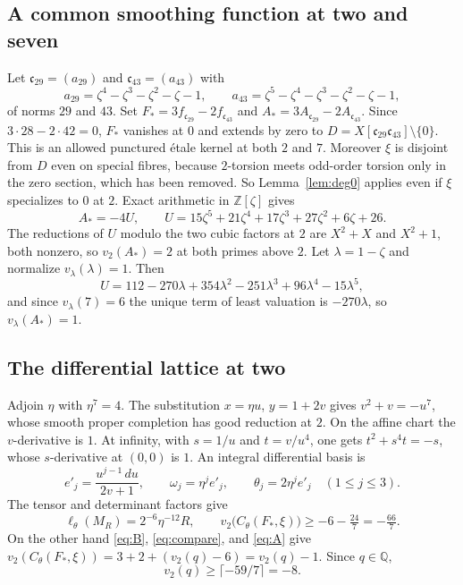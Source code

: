 \documentclass[11pt]{amsart}
\theoremstyle{remark}
\theoremstyle{definition}
\newcommand{\Q}{\mathbb{Q}}
\newcommand{\Z}{\mathbb{Z}}
\begin{document}
\subsection{A common smoothing function at two and seven}
Let $\mathfrak c_{29}=(a_{29})$ and $\mathfrak c_{43}=(a_{43})$ with
\[
a_{29}=\zeta^4-\zeta^3-\zeta^2-\zeta-1,\qquad a_{43}=\zeta^5-\zeta^4-\zeta^3-\zeta^2-\zeta-1,
\]
of norms $29$ and $43$. Set $F_*=3f_{\mathfrak c_{29}}-2f_{\mathfrak c_{43}}$ and $A_*=3A_{\mathfrak c_{29}}-2A_{\mathfrak c_{43}}$. Since $3\cdot28-2\cdot42=0$, $F_*$ vanishes at $0$ and extends by zero to $D=X[\mathfrak c_{29}\mathfrak c_{43}]\setminus\{0\}$. This is an allowed punctured \'etale kernel at both $2$ and $7$. Moreover $\xi$ is disjoint from $D$ even on special fibres, because $2$-torsion meets odd-order torsion only in the zero section, which has been removed. So Lemma~\ref{lem:deg0} applies even if $\xi$ specializes to $0$ at $2$. Exact arithmetic in $\Z[\zeta]$ gives
\begin{equation}\label{eq:A}
A_*=-4U,\qquad U=15\zeta^5+21\zeta^4+17\zeta^3+27\zeta^2+6\zeta+26.
\end{equation}
The reductions of $U$ modulo the two cubic factors at $2$ are $X^2+X$ and $X^2+1$, both nonzero, so $v_2(A_*)=2$ at both primes above $2$. Let $\lambda=1-\zeta$ and normalize $v_\lambda(\lambda)=1$. Then
\[
U=112-270\lambda+354\lambda^2-251\lambda^3+96\lambda^4-15\lambda^5,
\]
and since $v_\lambda(7)=6$ the unique term of least valuation is $-270\lambda$, so $v_\lambda(A_*)=1$.

\subsection{The differential lattice at two}
Adjoin $\eta$ with $\eta^7=4$. The substitution $x=\eta u$, $y=1+2v$ gives $v^2+v=-u^7$, whose smooth proper completion has good reduction at $2$. On the affine chart the $v$-derivative is $1$. At infinity, with $s=1/u$ and $t=v/u^4$, one gets $t^2+s^4t=-s$, whose $s$-derivative at $(0,0)$ is $1$. An integral differential basis is
\[
e'_j=\frac{u^{j-1}\,du}{2v+1},\qquad \omega_j=\eta^{j}e'_j,\qquad \theta_j=2\eta^{j}e'_j\quad(1\le j\le3).
\]
The tensor and determinant factors give
\[
\ell_\theta(M_R)=2^{-6}\eta^{-12}R,\qquad v_2\bigl(C_\theta(F_*,\xi)\bigr)\ge-6-\tfrac{24}{7}=-\tfrac{66}{7}.
\]
On the other hand \eqref{eq:B}, \eqref{eq:compare}, and \eqref{eq:A} give $v_2(C_\theta(F_*,\xi))=3+2+(v_2(q)-6)=v_2(q)-1$. Since $q\in\Q$,
\begin{equation}\label{eq:v2}
v_2(q)\ge\lceil-59/7\rceil=-8.
\end{equation}
\end{document}
